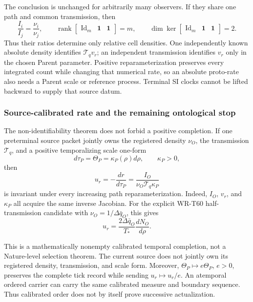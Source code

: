 \documentclass[11pt]{article}
\begin{document}
The conclusion is unchanged for arbitrarily many observers.  If they share
one path and common transmission, then
\begin{equation}
 \frac{I_i}{I_j}=\frac{\nu_i}{\nu_j},
 \qquad
 \operatorname{rank}\begin{bmatrix}\operatorname{Id}_m&\mathbf 1&\mathbf 1\end{bmatrix}=m,
 \qquad
 \dim\ker\begin{bmatrix}\operatorname{Id}_m&\mathbf 1&\mathbf 1\end{bmatrix}=2.
 \label{eq:multiobserver-calibration-rank}
\end{equation}
Thus their ratios determine only relative cell densities.  One independently
known absolute density identifies \(\mathcal T_qv_r\); an independent
transmission identifies \(v_r\) only in the chosen Parent parameter.  Positive
reparameterization preserves every integrated count while changing that
numerical rate, so an absolute proto-rate also needs a Parent scale or
reference process.  Terminal SI clocks cannot be lifted backward to supply
that source datum.

\subsubsection{Source-calibrated rate and the remaining ontological stop}

The non-identifiability theorem does not forbid a positive completion.  If one
preterminal source packet jointly owns the registered density \(\nu_O\), the
transmission \(\mathcal T_q\), and a positive temporalizing scale one-form
\begin{equation}
 d\tau_P=\Theta_P=\kappa_P(\rho)d\rho,
 \qquad \kappa_P>0,
 \label{eq:synthesis-parent-scale-form}
\end{equation}
then
\begin{equation}
 \boxed{
 u_r=-\frac{dr}{d\tau_P}
 =\frac{I_O}{\nu_O\mathcal T_q\kappa_P}}
 \label{eq:synthesis-calibrated-rate}
\end{equation}
is invariant under every increasing path reparameterization.  Indeed,
\(I_O\), \(v_r\), and \(\kappa_P\) all acquire the same inverse Jacobian.
For the explicit WR-T60 half-transmission candidate with
\(\nu_O=1/\Delta\bar q_O\), this gives
\begin{equation}
 u_r=\frac{2\Delta\bar q_O}{T_*}\frac{dN_O}{d\rho}.
 \label{eq:synthesis-half-calibrated-rate}
\end{equation}

This is a mathematically nonempty calibrated temporal completion, not a
Nature-level selection theorem.  The current source does not jointly own its
registered density, transmission, and scale form.  Moreover,
\(\Theta_P\mapsto e\Theta_P\), \(e>0\), preserves the complete tick record
while sending \(u_r\mapsto u_r/e\).  An atemporal ordered carrier can carry
the same calibrated measure and boundary sequence.  Thus calibrated order
does not by itself prove successive actualization.
\end{document}
